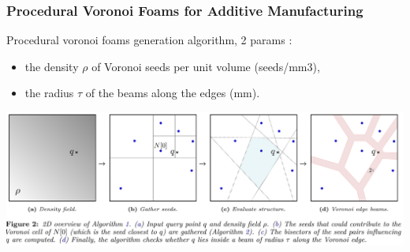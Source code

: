 
\frame
{
	\frametitle{Procedural Voronoi Foams for Additive Manufacturing}

Procedural voronoi foams generation algorithm, 2 params : 
\begin{itemize}
	\item the density $\rho$ of Voronoi seeds per unit volume (seeds/mm3), 
	\item the radius $\tau$ of the beams along the edges (mm).
\end{itemize}

\includegraphics[width=\textwidth]{img/voronoi/algovoronoi.png}

}


